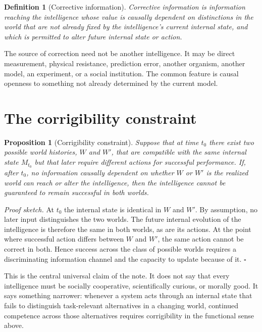 \documentclass[11pt,a4paper]{article}
\newtheorem{proposition}{Proposition}
\newtheorem{definition}{Definition}
\begin{document}
\begin{definition}[Corrective information]
Corrective information is information reaching the intelligence whose value is causally dependent on distinctions in the world that are not already fixed by the intelligence's current internal state, and which is permitted to alter future internal state or action.
\end{definition}

The source of correction need not be another intelligence. It may be direct measurement, physical resistance, prediction error, another organism, another model, an experiment, or a social institution. The common feature is causal openness to something not already determined by the current model.

\section{The corrigibility constraint}

\begin{proposition}[Corrigibility constraint]
Suppose that at time $t_0$ there exist two possible world histories, $W$ and $W'$, that are compatible with the same internal state $M_{t_0}$ but that later require different actions for successful performance. If, after $t_0$, no information causally dependent on whether $W$ or $W'$ is the realized world can reach or alter the intelligence, then the intelligence cannot be guaranteed to remain successful in both worlds.
\end{proposition}

\textit{Proof sketch.} At $t_0$ the internal state is identical in $W$ and $W'$. By assumption, no later input distinguishes the two worlds. The future internal evolution of the intelligence is therefore the same in both worlds, as are its actions. At the point where successful action differs between $W$ and $W'$, the same action cannot be correct in both. Hence success across the class of possible worlds requires a discriminating information channel and the capacity to update because of it. $\square$

This is the central universal claim of the note. It does not say that every intelligence must be socially cooperative, scientifically curious, or morally good. It says something narrower: whenever a system acts through an internal state that fails to distinguish task-relevant alternatives in a changing world, continued competence across those alternatives requires corrigibility in the functional sense above.
\end{document}
